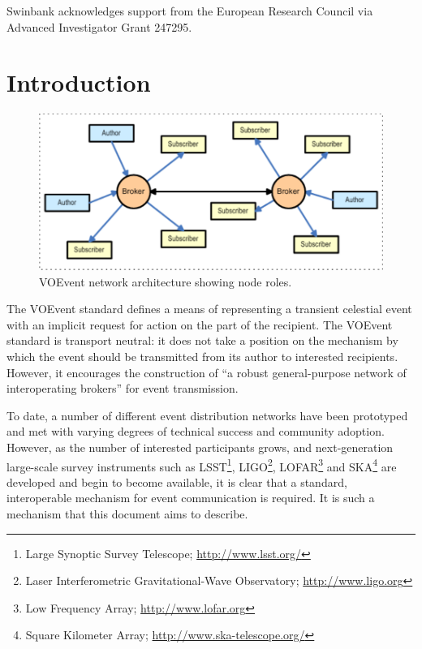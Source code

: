 \documentclass[a4paper,11pt]{ivoa}
\begin{document}
Swinbank acknowledges support from the European Research Council via Advanced
Investigator Grant 247295.

\newpage

\tableofcontents

\newpage

\section{Introduction}
\label{sec:intro}

\begin{figure}
  \begin{center}
  \includegraphics{figures/network.pdf}
  \end{center}

  \caption{VOEvent network architecture showing node roles.}

  \label{fig:network}
\end{figure}

The VOEvent standard \citep{Seaman:2011} defines a means of representing a
transient celestial event with an implicit request for action on the part of
the recipient. The VOEvent standard is transport neutral: it does not take a
position on the mechanism by which the event should be transmitted from its
author to interested recipients. However, it encourages the construction of
``a robust general-purpose network of interoperating brokers'' for event
transmission.

To date, a number of different event distribution networks have been
prototyped and met with varying degrees of technical success and community
adoption. However, as the number of interested participants grows, and
next-generation large-scale survey instruments such as LSST\footnote{Large
Synoptic Survey Telescope; \url{http://www.lsst.org/}}, LIGO\footnote{Laser
Interferometric Gravitational-Wave Observatory; \url{http://www.ligo.org}},
LOFAR\footnote{Low Frequency Array; \url{http://www.lofar.org}} and
SKA\footnote{Square Kilometer Array; \url{http://www.ska-telescope.org/}} are
developed and begin to become available, it is clear that a standard,
interoperable mechanism for event communication is required. It is such a
mechanism that this document aims to describe.
\end{document}
